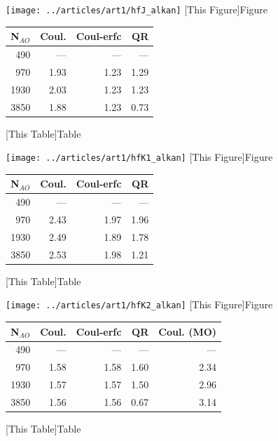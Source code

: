 %
\begin{figure}
\begin{minipage}{0.5\textwidth}
\texttt{[image: ../articles/art1/hfJ\_alkan]}
[This Figure]{Figure}
\end{minipage}
\hspace{0.05\textwidth}
\begin{minipage}{0.3\textwidth}
\begin{tabular}{rrrr}
\hline
N$_{AO}$ & Coul. & Coul-erfc & QR \\ \hline
490 & --- & --- & --- \\ 
970 & 1.93 & 1.23 & 1.29 \\ 
1930 & 2.03 & 1.23 & 1.23 \\ 
3850 & 1.88 & 1.23 & 0.73 \\ \hline
\end{tabular}
[This Table]{Table}
\end{minipage}
\end{figure}
%
\begin{figure}
\begin{minipage}{0.5\textwidth}
\texttt{[image: ../articles/art1/hfK1\_alkan]}
[This Figure]{Figure}
\end{minipage}
\hspace{0.05\textwidth}
\begin{minipage}{0.3\textwidth}
\begin{tabular}{rrrr}
\hline
N$_{AO}$ & Coul. & Coul-erfc & QR \\ \hline
490 & --- & --- & --- \\ 
970 & 2.43 & 1.97 & 1.96 \\ 
1930 & 2.49 & 1.89 & 1.78 \\ 
3850 & 2.53 & 1.98 & 1.21 \\ \hline
\end{tabular}
[This Table]{Table}
\end{minipage}
\end{figure}
%
\begin{figure}
\begin{minipage}{0.5\textwidth}
\texttt{[image: ../articles/art1/hfK2\_alkan]}
[This Figure]{Figure}
\end{minipage}
\hspace{0.05\textwidth}
\begin{minipage}{0.3\textwidth}
\begin{tabular}{rrrrr}
\hline
N$_{AO}$ & Coul. & Coul-erfc & QR & Coul. (MO) \\ \hline
490 & --- & --- & --- & --- \\ 
970 & 1.58 & 1.58 & 1.60 & 2.34 \\ 
1930 & 1.57 & 1.57 & 1.50 & 2.96 \\ 
3850 & 1.56 & 1.56 & 0.67 & 3.14 \\ \hline
\end{tabular}
[This Table]{Table}
\end{minipage}
\end{figure}

